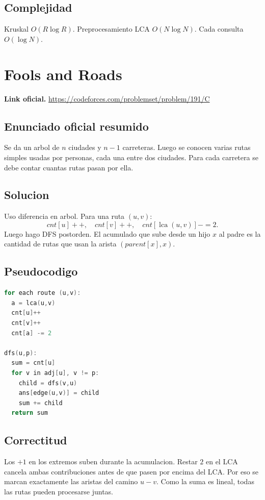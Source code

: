 \documentclass[10pt]{article}
\newcommand{\bigO}{O}
\newcommand{\lca}{\operatorname{lca}}
\begin{document}
\subsection{Complejidad}
Kruskal $\bigO(R\log R)$. Preprocesamiento LCA $\bigO(N\log N)$. Cada consulta
$\bigO(\log N)$.

\newpage

\section{Fools and Roads}
\textbf{Link oficial.} \url{https://codeforces.com/problemset/problem/191/C}

\subsection{Enunciado oficial resumido}
Se da un arbol de $n$ ciudades y $n-1$ carreteras. Luego se conocen varias rutas
simples usadas por personas, cada una entre dos ciudades. Para cada carretera se
debe contar cuantas rutas pasan por ella.

\subsection{Solucion}
Uso diferencia en arbol. Para una ruta $(u,v)$:
\[
cnt[u]++,\quad cnt[v]++,\quad cnt[\lca(u,v)]-=2.
\]
Luego hago DFS postorden. El acumulado que sube desde un hijo $x$ al padre es
la cantidad de rutas que usan la arista $(parent[x],x)$.

\subsection{Pseudocodigo}
\begin{lstlisting}[language=C++]
for each route (u,v):
  a = lca(u,v)
  cnt[u]++
  cnt[v]++
  cnt[a] -= 2

dfs(u,p):
  sum = cnt[u]
  for v in adj[u], v != p:
    child = dfs(v,u)
    ans[edge(u,v)] = child
    sum += child
  return sum
\end{lstlisting}

\subsection{Correctitud}
Los $+1$ en los extremos suben durante la acumulacion. Restar $2$ en el LCA
cancela ambas contribuciones antes de que pasen por encima del LCA. Por eso se
marcan exactamente las aristas del camino $u-v$. Como la suma es lineal, todas
las rutas pueden procesarse juntas.
\end{document}
